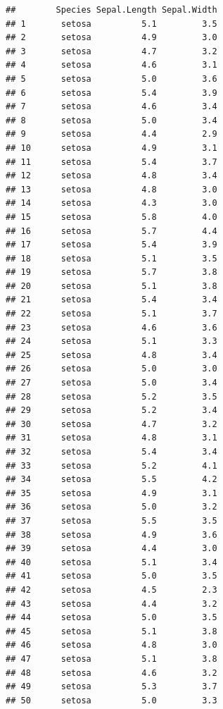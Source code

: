 \documentclass[krantz2]{krantz}\usepackage{knitr}%
\begin{document}
\begin{knitrout}\footnotesize
{}\color{fgcolor}\begin{kframe}
\begin{alltt}
 \hlstd{(}\hlstd{))}
\end{alltt}
\begin{verbatim}
##        Species Sepal.Length Sepal.Width
## 1       setosa          5.1         3.5
## 2       setosa          4.9         3.0
## 3       setosa          4.7         3.2
## 4       setosa          4.6         3.1
## 5       setosa          5.0         3.6
## 6       setosa          5.4         3.9
## 7       setosa          4.6         3.4
## 8       setosa          5.0         3.4
## 9       setosa          4.4         2.9
## 10      setosa          4.9         3.1
## 11      setosa          5.4         3.7
## 12      setosa          4.8         3.4
## 13      setosa          4.8         3.0
## 14      setosa          4.3         3.0
## 15      setosa          5.8         4.0
## 16      setosa          5.7         4.4
## 17      setosa          5.4         3.9
## 18      setosa          5.1         3.5
## 19      setosa          5.7         3.8
## 20      setosa          5.1         3.8
## 21      setosa          5.4         3.4
## 22      setosa          5.1         3.7
## 23      setosa          4.6         3.6
## 24      setosa          5.1         3.3
## 25      setosa          4.8         3.4
## 26      setosa          5.0         3.0
## 27      setosa          5.0         3.4
## 28      setosa          5.2         3.5
## 29      setosa          5.2         3.4
## 30      setosa          4.7         3.2
## 31      setosa          4.8         3.1
## 32      setosa          5.4         3.4
## 33      setosa          5.2         4.1
## 34      setosa          5.5         4.2
## 35      setosa          4.9         3.1
## 36      setosa          5.0         3.2
## 37      setosa          5.5         3.5
## 38      setosa          4.9         3.6
## 39      setosa          4.4         3.0
## 40      setosa          5.1         3.4
## 41      setosa          5.0         3.5
## 42      setosa          4.5         2.3
## 43      setosa          4.4         3.2
## 44      setosa          5.0         3.5
## 45      setosa          5.1         3.8
## 46      setosa          4.8         3.0
## 47      setosa          5.1         3.8
## 48      setosa          4.6         3.2
## 49      setosa          5.3         3.7
## 50      setosa          5.0         3.3

\end{verbatim}
\end{kframe}
\end{knitrout}
\end{document}
